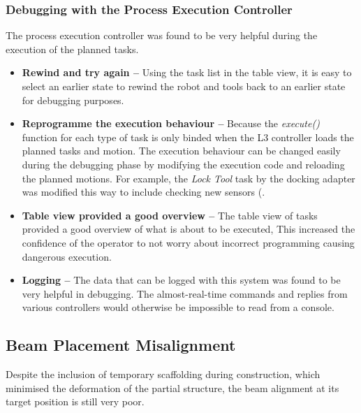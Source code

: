 \subsubsection{Debugging with the Process Execution Controller}
\label{subsubsection:exploration-3-debugging-with-the-process-execution-controller}

The process execution controller  was found to be very helpful during the execution of the planned tasks. 

\begin{itemize}
	\item \textbf{Rewind and try again --} Using the task list in the table view, it is easy to select an earlier state to rewind the robot and tools back to an earlier state for debugging purposes.

	\item \textbf{Reprogramme the execution behaviour --} Because the \textit{execute() }function for each type of task is only binded when the L3 controller loads the planned tasks and motion. The execution behaviour can be changed easily during the debugging phase by modifying the execution code and reloading the planned motions. For example, the \textit{Lock Tool }task by the docking adapter was modified this way to include checking new sensors (.

	\item \textbf{Table view provided a good overview --} The table view of tasks provided a good overview of what is about to be executed, This increased the confidence of the operator to not worry about incorrect programming causing dangerous execution.

	\item \textbf{Logging --} The data that can be logged with this system was found to be very helpful in debugging. The almost-real-time commands and replies from various controllers would otherwise be impossible to read from a console.

\end{itemize}
\subsection{Beam Placement Misalignment}
\label{subsection:exploration-3-beam-placement-misalignment}

Despite the inclusion of temporary scaffolding during construction, which minimised the deformation of the partial structure, the beam alignment at its target position is still very poor.

